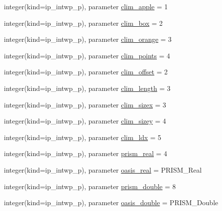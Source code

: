 \begin{DoxyCompactItemize}
\item 
integer(kind=ip\+\_\+intwp\+\_\+p), parameter \hyperlink{classmod__oasis__parameters_a3cfd98fdd1c2fac653b182454c87f4aa}{clim\+\_\+apple} = 1
\item 
integer(kind=ip\+\_\+intwp\+\_\+p), parameter \hyperlink{classmod__oasis__parameters_a9a8b38629274e3a38a37f329ce9d2aa2}{clim\+\_\+box} = 2
\item 
integer(kind=ip\+\_\+intwp\+\_\+p), parameter \hyperlink{classmod__oasis__parameters_a17c74cc8141b595e448588b1add0f6bf}{clim\+\_\+orange} = 3
\item 
integer(kind=ip\+\_\+intwp\+\_\+p), parameter \hyperlink{classmod__oasis__parameters_aa9d90a3d7d5b21d2081a578dfea42fd4}{clim\+\_\+points} = 4
\item 
integer(kind=ip\+\_\+intwp\+\_\+p), parameter \hyperlink{classmod__oasis__parameters_a4cd07733eaf5d8c8148986c0c4217772}{clim\+\_\+offset} = 2
\item 
integer(kind=ip\+\_\+intwp\+\_\+p), parameter \hyperlink{classmod__oasis__parameters_a984896e821cbbb8c4a91e86ff19d54de}{clim\+\_\+length} = 3
\item 
integer(kind=ip\+\_\+intwp\+\_\+p), parameter \hyperlink{classmod__oasis__parameters_a4fb35a666ab4cec927a2ae9244535cb0}{clim\+\_\+sizex} = 3
\item 
integer(kind=ip\+\_\+intwp\+\_\+p), parameter \hyperlink{classmod__oasis__parameters_a206910560c246db3404224a04cfd4319}{clim\+\_\+sizey} = 4
\item 
integer(kind=ip\+\_\+intwp\+\_\+p), parameter \hyperlink{classmod__oasis__parameters_a3407c11054d24782182c649307808e47}{clim\+\_\+ldx} = 5
\item 
integer(kind=ip\+\_\+intwp\+\_\+p), parameter \hyperlink{classmod__oasis__parameters_a02e0627219e7769df37e3d55da46f65d}{prism\+\_\+real} = 4
\item 
integer(kind=ip\+\_\+intwp\+\_\+p), parameter \hyperlink{classmod__oasis__parameters_ae7760fcfae19d2f3cbf759688cd35193}{oasis\+\_\+real} = P\+R\+I\+S\+M\+\_\+\+Real
\item 
integer(kind=ip\+\_\+intwp\+\_\+p), parameter \hyperlink{classmod__oasis__parameters_a9527d2d640ea7d747143bf994ee9b206}{prism\+\_\+double} = 8
\item 
integer(kind=ip\+\_\+intwp\+\_\+p), parameter \hyperlink{classmod__oasis__parameters_a1071adbbf4c378907b4ff69dd53d0d7e}{oasis\+\_\+double} = P\+R\+I\+S\+M\+\_\+\+Double
\end{DoxyCompactItemize}



